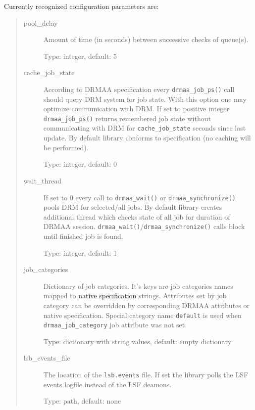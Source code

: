 \documentclass[a4paper,10pt,english]{article}
\begin{document}
Currently recognized configuration parameters are:
%
\begin{quote}
%
\begin{description}
\item[{pool\_delay}] \leavevmode 
Amount of time (in seconds) between successive checks of queue(s).

Type: integer, default: 5

\item[{cache\_job\_state}] \leavevmode 
According to DRMAA specification every \texttt{drmaa\_job\_ps()} call should
query DRM system for job state.  With this option one may optimize
communication with DRM.  If set to positive integer \texttt{drmaa\_job\_ps()}
returns remembered job state without communicating with DRM for
\texttt{cache\_job\_state} seconds since last update.  By default library
conforms to specification (no caching will be performed).

Type: integer, default: 0

\item[{wait\_thread}] \leavevmode 
If set to 0 every call to \texttt{drmaa\_wait()} or \texttt{drmaa\_synchronize()} pools
DRM for selected/all jobs. By default library creates additional
thread which checks state of all job for duration of DRMAA session.
\texttt{drmaa\_wait()}/\texttt{drmaa\_synchronize()} calls block until finished job
is found.

Type: integer, default: 1

\item[{job\_categories}] \leavevmode 
Dictionary of job categories.  It's keys are job categories names
mapped to \hyperref[native-specification]{native specification} strings.  Attributes set by job
category can be overridden by corresponding DRMAA attributes or
native specification.  Special category name \texttt{default} is used when
\texttt{drmaa\_job\_category} job attribute was not set.

Type: dictionary with string values, default: empty dictionary

\item[{lsb\_events\_file}] \leavevmode 
The location of the \texttt{lsb.events} file. If set the library polls
the LSF events logfile instead of the LSF deamons.

Type: path, default: none

\end{description}

\end{quote}
\end{document}
